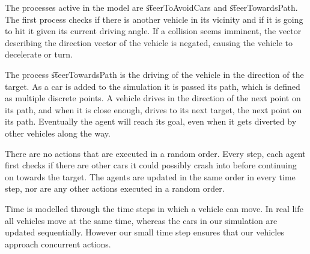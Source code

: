The processes active in the model are \t{steerToAvoidCars} and \t{steerTowardsPath}. The first process checks if there is another vehicle in its vicinity and if it is going to hit it given its current driving angle. If a collision seems imminent, the vector describing the direction vector of the vehicle is negated, causing the vehicle to decelerate or turn.

The process \t{steerTowardsPath} is the driving of the vehicle in the direction of the target. As a car is added to the simulation it is passed its path, which is defined as multiple discrete points.  A vehicle drives in the direction of the next point on its path, and when it is close enough, drives to its next target, the next point on its path. Eventually the agent will reach its goal, even when it gets diverted by other vehicles along the way.

There are no actions that are executed in a random order.
Every step, each agent first checks if there are other cars it could possibly crash into before continuing on towards the target. The agents are updated in the same order in every time step, nor are any other actions executed in a random order.

Time is modelled through the time steps in which a vehicle can move. In real life all vehicles move at the same time, whereas the cars in our simulation are updated sequentially. However our small time step ensures that our vehicles approach concurrent actions. 



